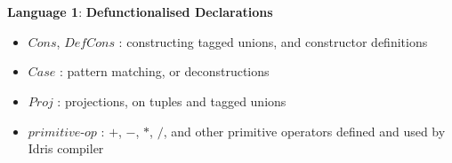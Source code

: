 \documentclass[a1,portrait]{a1poster}
\begin{document}
\begin{multicols}{2}
\begin{multicols}{2}
\begin{minipage}[b]{1\linewidth}
\begin{bnf*}
    \\
    \\
    \\
    \\
    \\
    \\
    \\
    \\
    \\
    \\
    \\
    \\
\end{bnf*}
\end{minipage}
\vspace{-1cm}
\end{multicols}
\vspace{-1.5cm}
\begin{center}  \textbf{Language 1}: \color{DarkRed} \textbf{Defunctionalised Declarations} \end{center}

\begin{itemize}
    \setlength\itemsep{-0.38em}
    \item $Cons$, $DefCons$ : constructing tagged unions, and constructor definitions
    \item $Case$ : pattern matching, or deconstructions
    \item $Proj$ : projections, on tuples and tagged unions
    \item $primitive$-$op$ : $+$, $-$, $*$, $/$, and other primitive operators defined and used by Idris compiler
\end{itemize}


\end{multicols}
\end{document}
